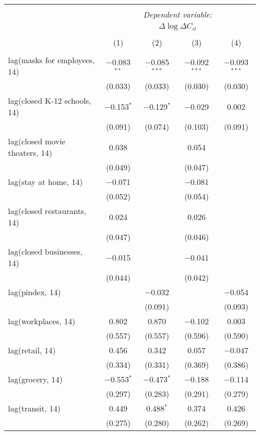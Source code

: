 \begin{tabular}{@{\extracolsep{1pt}}lcccc} 
\\[-1.8ex]\hline 
\hline \\[-1.8ex] 
 & \multicolumn{4}{c}{\textit{Dependent variable:}} \\ 
\cline{2-5} 
 & \multicolumn{4}{c}{$\Delta \log \Delta C_{it}$} \\ 
\\[-1.8ex] & (1) & (2) & (3) & (4)\\ 
\hline \\[-1.8ex] 
 lag(masks for employees, 14) & $-$0.083$^{**}$ & $-$0.085$^{***}$ & $-$0.092$^{***}$ & $-$0.093$^{***}$ \\ 
  & (0.033) & (0.033) & (0.030) & (0.030) \\ 
  lag(closed K-12 schools, 14) & $-$0.153$^{*}$ & $-$0.129$^{*}$ & $-$0.029 & 0.002 \\ 
  & (0.091) & (0.074) & (0.103) & (0.091) \\ 
  lag(closed movie theaters, 14) & 0.038 &  & 0.054 &  \\ 
  & (0.049) &  & (0.047) &  \\ 
  lag(stay at home, 14) & $-$0.071 &  & $-$0.081 &  \\ 
  & (0.052) &  & (0.054) &  \\ 
  lag(closed restaurants, 14) & 0.024 &  & 0.026 &  \\ 
  & (0.047) &  & (0.046) &  \\ 
  lag(closed businesses, 14) & $-$0.015 &  & $-$0.041 &  \\ 
  & (0.044) &  & (0.042) &  \\ 
  lag(pindex, 14) &  & $-$0.032 &  & $-$0.054 \\ 
  &  & (0.091) &  & (0.093) \\ 
  lag(workplaces, 14) & 0.802 & 0.870 & $-$0.102 & 0.003 \\ 
  & (0.557) & (0.557) & (0.596) & (0.590) \\ 
  lag(retail, 14) & 0.456 & 0.342 & 0.057 & $-$0.047 \\ 
  & (0.334) & (0.331) & (0.369) & (0.386) \\ 
  lag(grocery, 14) & $-$0.553$^{*}$ & $-$0.473$^{*}$ & $-$0.188 & $-$0.114 \\ 
  & (0.297) & (0.283) & (0.291) & (0.279) \\ 
  lag(transit, 14) & 0.449 & 0.488$^{*}$ & 0.374 & 0.426 \\ 
  & (0.275) & (0.280) & (0.262) & (0.269) \\ 

\end{tabular}
